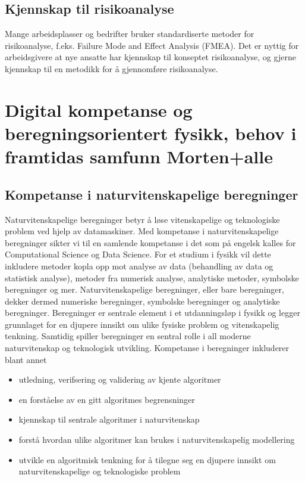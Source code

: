 \documentclass{article}
\begin{document}
\subsection{Kjennskap til risikoanalyse}
Mange arbeidsplasser og bedrifter bruker standardiserte metoder for risikoanalyse, f.eks. Failure Mode and Effect Analysis (FMEA). Det er nyttig for arbeidsgivere at nye ansatte har kjennskap til konseptet risikoanalyse, og gjerne kjennskap til en metodikk for å gjennomføre risikoanalyse.

\section{Digital kompetanse og beregningsorientert fysikk, behov i framtidas samfunn {\color{red} Morten+alle}}
\subsection{Kompetanse i naturvitenskapelige beregninger}

Naturvitenskapelige beregninger betyr å løse vitenskapelige og teknologiske problem ved hjelp av datamaskiner. 
Med kompetanse i naturvitenskapelige beregninger sikter vi til en samlende kompetanse i det som på engelsk kalles for Computational Science og Data Science. For et studium i fysikk vil dette inkludere metoder kopla opp mot analyse av data (behandling av data og statistisk analyse), metoder fra numerisk analyse, analytiske metoder, symbolske beregninger og mer. 
Naturvitenskapelige beregninger, eller bare beregninger, dekker dermed numeriske beregninger, symbolske beregninger og analytiske beregninger.  Beregninger er sentrale element i et utdanningsløp i fysikk og legger grunnlaget for en djupere innsikt om ulike fysiske problem og vitenskapelig tenkning. Samtidig spiller beregninger en sentral rolle i all moderne naturvitenskap og teknologisk utvikling. 
Kompetanse i beregninger inkluderer blant annet

\begin{itemize}
\item utledning, verifsering og validering av kjente algoritmer

\item en forståelse av en gitt algoritmes begrensninger

\item kjennskap til sentrale algoritmer i naturvitenskap

\item forstå hvordan ulike algoritmer kan brukes i naturvitenskapelig modellering

\item utvikle en algoritmisk tenkning for å tilegne seg en djupere innsikt om naturvitenskapelige og teknologiske problem

\end{itemize}
\end{document}
